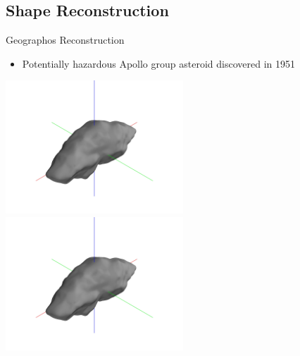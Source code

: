 \subsection{Shape Reconstruction}
\begin{frame}{Geographos Reconstruction}
    \begin{itemize}
        \item Potentially hazardous Apollo group asteroid discovered in 1951
    \end{itemize}
    
    \begin{center}
        \href{https://youtu.be/Fy3b80CP2-0}{\includegraphics[trim={20cm 15cm 20cm 15cm},clip,keepaspectratio,width=0.5\textwidth]{figures/computational_geometry/mesh_update/geographos/partial_7489.jpg}}%
        \href{https://youtu.be/UqISXOuV0ZQ}{\includegraphics[trim={20cm 15cm 20cm 15cm},clip,keepaspectratio,width=0.5\textwidth]{figures/computational_geometry/mesh_update/geographos/partial_7489.jpg}}
\end{center}

\end{frame}

